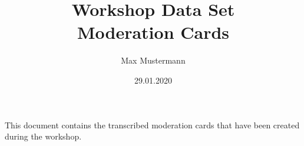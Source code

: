 \documentclass{article}
\title{Workshop Data Set\\Moderation Cards}
\author{Max Mustermann}
\date{29.01.2020}
\begin{document}
\maketitle

This document contains the transcribed moderation cards that have been created during the workshop.


\newpage

\newpage


\printacronyms[include-classes=abbrev,name=Abbreviations]
\end{document}

